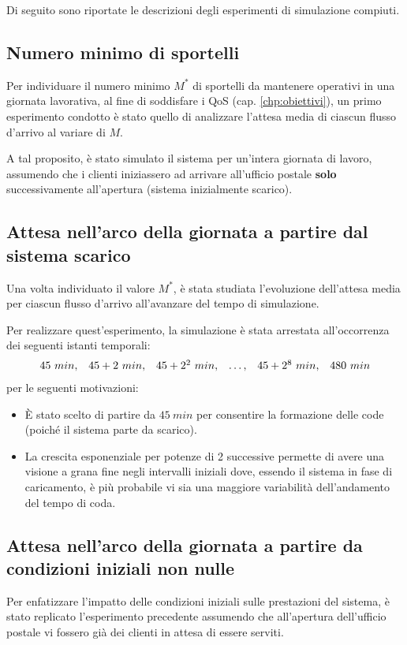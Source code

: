 Di seguito sono riportate le descrizioni degli esperimenti di simulazione compiuti.

\subsection*{Numero minimo di sportelli}
Per individuare il numero minimo $M^*$ di sportelli da mantenere operativi in una giornata lavorativa, al fine di soddisfare i QoS (cap. \ref{chp:obiettivi}), un primo esperimento condotto è stato quello di analizzare l'attesa media di ciascun flusso d'arrivo al variare di $M$.

A tal proposito, è stato simulato il sistema per un'intera giornata di lavoro, assumendo che i clienti iniziassero ad arrivare all'ufficio postale \textbf{solo} successivamente all'apertura (sistema inizialmente scarico).

\subsection*{Attesa nell'arco della giornata a partire dal sistema scarico}
Una volta individuato il valore $M^*$, è stata studiata l'evoluzione dell'attesa media per ciascun flusso d'arrivo all'avanzare del tempo di simulazione.

Per realizzare quest'esperimento, la simulazione è stata arrestata all'occorrenza dei seguenti istanti temporali:
\begin{equation}
\begin{array}{l l l l l l}
45\ min, & 45 + 2\ min, & 45 + 2^2\ min, & \dots, & 45 + 2^8\ min, & 480\ min
\end{array}
\end{equation}
per le seguenti motivazioni:
\begin{itemize}
\item È stato scelto di partire da $45\ min$ per consentire la formazione delle code (poiché il sistema parte da scarico).
\item La crescita esponenziale per potenze di 2 successive permette di avere una visione a grana fine negli intervalli iniziali dove, essendo il sistema in fase di caricamento, è più probabile vi sia una maggiore variabilità dell'andamento del tempo di coda. 
\end{itemize}

\subsection*{Attesa nell'arco della giornata a partire da condizioni iniziali non nulle}
Per enfatizzare l'impatto delle condizioni iniziali sulle prestazioni del sistema, è stato replicato l'esperimento precedente assumendo che all'apertura dell'ufficio postale vi fossero già dei clienti in attesa di essere serviti.

